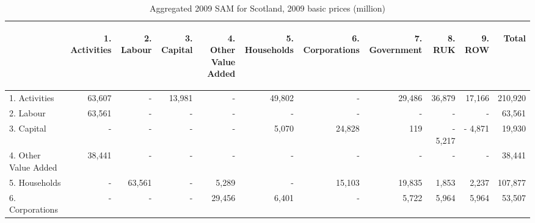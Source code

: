 \bigskip

  \begin{table}[H] \caption{Aggregated 2009 SAM for Scotland, 2009 basic prices (\textsterling million)}
  \bigskip \begin{scriptsize} \begin{centering} \begin{doublespacing}
  \begin{tabular}{lrrrrrrrrrr}
  \toprule
  & \begin{sideways}1. Activities \end{sideways} &
  \begin{sideways}2. Labour \end{sideways} &
  \begin{sideways}3. Capital \end{sideways} &
  \begin{sideways}4. Other Value Added \end{sideways} &
  \begin{sideways}5. Households \end{sideways} &
  \begin{sideways}6. Corporations \end{sideways} &
  \begin{sideways}7. Government \end{sideways} &
  \begin{sideways}8. RUK \end{sideways} &
  \begin{sideways}9. ROW \end{sideways} &
  \begin{sideways} Total \end{sideways} \bigstrut[b]\\
  \hline
  1. Activities  & 63,607   & - & 13,981 & - & 49,802   & - & 29,486 &
  36,879 & 17,166 & 210,920  \bigstrut[t]\\
  2. Labour    & 63,561   & - & - & - & -    & - & - & - & - & 63,561  \\
  3. Capital   & -    & - & - & - &   5,070  & 24,828 & 119  & - 5,217 & -
  4,871 & 19,930  \\
  4. Other Value Added    & 38,441   & - & - & - & -    & - & - & - & - &
  38,441  \\
  5. Households  & -    & 63,561 & - & 5,289 & -    & 15,103 & 19,835 &
  1,853 & 2,237 & 107,877  \\
  6. Corporations & -    & - & - & 29,456 &   6,401  & - & 5,722 & 5,964 &
  5,964 & 53,507  \\

\end{tabular}
\end{doublespacing}
\end{centering}
\end{scriptsize}
\end{table}
